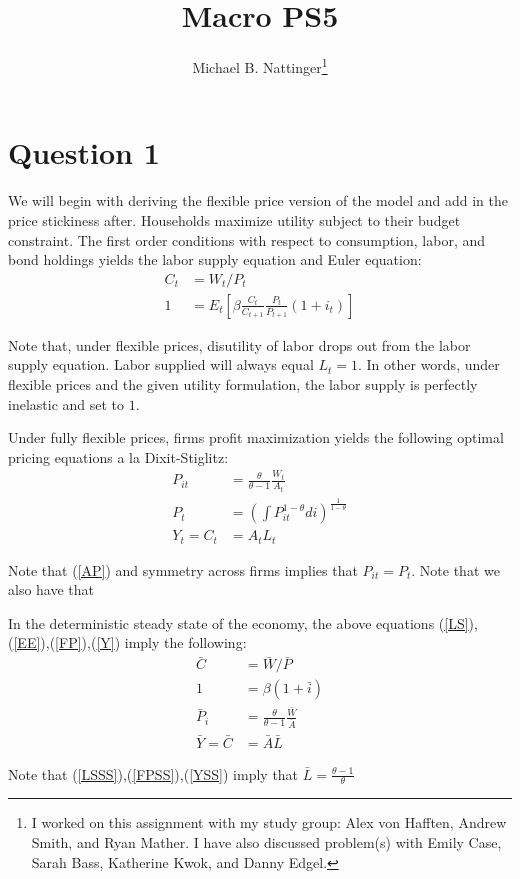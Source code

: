 \documentclass[11pt]{article} %
\title{Macro PS5}
\author{Michael B. Nattinger\footnote{I worked on this assignment with my study group: Alex von Hafften, Andrew Smith, and Ryan Mather. I have also discussed problem(s) with Emily Case, Sarah Bass, Katherine Kwok, and Danny Edgel.}}
\begin{document}
\maketitle
\section{Question 1}
We will begin with deriving the flexible price version of the model and add in the price stickiness after. Households maximize utility subject to their budget constraint. The first order conditions with respect to consumption, labor, and bond holdings yields the labor supply equation and Euler equation:
\begin{align}
C_t &= W_t/P_t \label{LS}\\
1 &= E_t\left[ \beta \frac{C_t}{C_{t+1}} \frac{P_t}{P_{t+1}} (1+i_t) \right] \label{EE}
\end{align}

Note that, under flexible prices, disutility of labor drops out from the labor supply equation. Labor supplied will always equal $L_t = 1$. In other words, under flexible prices and the given utility formulation, the labor supply is perfectly inelastic and set to $1$.

Under fully flexible prices, firms profit maximization yields the following optimal pricing equations a la Dixit-Stiglitz:
\begin{align}
P_{it} &= \frac{\theta}{\theta - 1}\frac{W_t}{A_{t}} \label{FP}\\
P_{t} &= \left(\int P_{it}^{1-\theta } di \right)^{\frac{1}{1-\theta}} \label{AP} \\
Y_t = C_t &= A_tL_t \label{Y}
\end{align}

Note that (\ref{AP}) and symmetry across firms implies that $P_{it} = P_t$. Note that we also have that 

In the deterministic steady state of the economy, the above equations (\ref{LS}),(\ref{EE}),(\ref{FP}),(\ref{Y}) imply the following:
\begin{align}
\bar{C} &= \bar{W}/\bar{P} \label{LSSS}\\
1 &= \beta(1+\bar{i}) \label{EESS}\\
\bar{P}_{i} &= \frac{\theta}{\theta - 1}\frac{\bar{W}}{\bar{A}} \label{FPSS}\\
\bar{Y} = \bar{C} &= \bar{A}\bar{L} \label{YSS}
\end{align}

Note that (\ref{LSSS}),(\ref{FPSS}),(\ref{YSS}) imply that $\bar{L} = \frac{\theta - 1}{\theta}$
\end{document}
